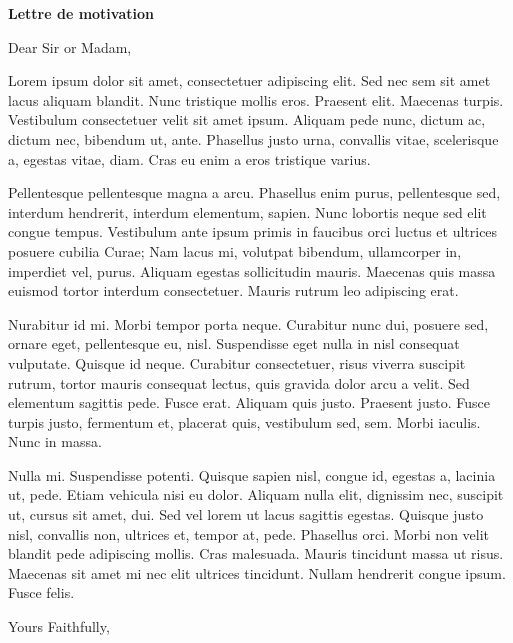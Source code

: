 \documentclass[12pt]{letter}
\begin{document}
  \begin{letter}{\textbf{Lettre de motivation}}
    \opening{Dear Sir or Madam,}

\indent Lorem ipsum dolor sit amet, consectetuer adipiscing elit. Sed nec sem sit amet
lacus aliquam blandit. Nunc tristique mollis eros. Praesent elit. Maecenas turpis.
Vestibulum consectetuer velit sit amet ipsum. Aliquam pede nunc, dictum ac,
dictum nec, bibendum ut, ante. Phasellus justo urna, convallis vitae, scelerisque
a, egestas vitae, diam. Cras eu enim a eros tristique varius.

\indent Pellentesque pellentesque magna a arcu. Phasellus enim purus, pellentesque sed,
interdum hendrerit, interdum elementum, sapien. Nunc lobortis neque sed elit
congue tempus. Vestibulum ante ipsum primis in faucibus orci luctus et ultrices
posuere cubilia Curae; Nam lacus mi, volutpat bibendum, ullamcorper in,
imperdiet vel, purus. Aliquam egestas sollicitudin mauris. Maecenas quis massa
euismod tortor interdum consectetuer. Mauris rutrum leo adipiscing erat.

\indent Nurabitur id mi. Morbi tempor porta neque. Curabitur nunc dui, posuere sed,
ornare eget, pellentesque eu, nisl. Suspendisse eget nulla in nisl consequat
vulputate. Quisque id neque. Curabitur consectetuer, risus viverra suscipit
rutrum, tortor mauris consequat lectus, quis gravida dolor arcu a velit. Sed
elementum sagittis pede. Fusce erat. Aliquam quis justo. Praesent justo. Fusce
turpis justo, fermentum et, placerat quis, vestibulum sed, sem. Morbi iaculis.
Nunc in massa.

\indent Nulla mi. Suspendisse potenti. Quisque sapien nisl, congue id, egestas a, lacinia
ut, pede. Etiam vehicula nisi eu dolor. Aliquam nulla elit, dignissim nec, suscipit
ut, cursus sit amet, dui. Sed vel lorem ut lacus sagittis egestas. Quisque justo
nisl, convallis non, ultrices et, tempor at, pede. Phasellus orci. Morbi non velit
blandit pede adipiscing mollis. Cras malesuada. Mauris tincidunt massa ut risus.
Maecenas sit amet mi nec elit ultrices tincidunt. Nullam hendrerit congue ipsum.
Fusce felis.

    \closing{Yours Faithfully,}
  \end{letter}
\end{document}
